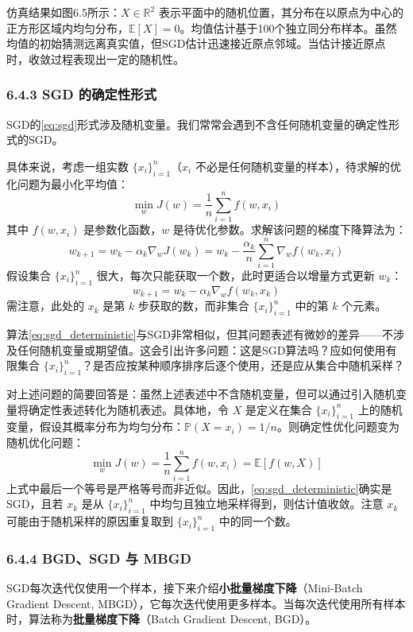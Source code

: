 \documentclass[UTF8]{article}
\begin{document}
仿真结果如图6.5所示：$X \in \mathbb{R}^2$ 表示平面中的随机位置，其分布在以原点为中心的正方形区域内均匀分布，$\mathbb{E}[X] = 0$。均值估计基于100个独立同分布样本。虽然均值的初始猜测远离真实值，但SGD估计迅速接近原点邻域。当估计接近原点时，收敛过程表现出一定的随机性。

\subsubsection*{6.4.3 SGD 的确定性形式}

SGD的\eqref{eq:sgd}形式涉及随机变量。我们常常会遇到不含任何随机变量的确定性形式的SGD。

具体来说，考虑一组实数 $\{x_i\}_{i=1}^{n}$（$x_i$ 不必是任何随机变量的样本），待求解的优化问题为最小化平均值：
\[
\min_w J(w) = \frac{1}{n}\sum_{i=1}^{n} f(w, x_i)
\]
其中 $f(w, x_i)$ 是参数化函数，$w$ 是待优化参数。求解该问题的梯度下降算法为：
\[
w_{k+1} = w_k - \alpha_k \nabla_w J(w_k) = w_k - \frac{\alpha_k}{n}\sum_{i=1}^{n} \nabla_w f(w_k, x_i)
\]
假设集合 $\{x_i\}_{i=1}^{n}$ 很大，每次只能获取一个数，此时更适合以增量方式更新 $w_k$：
\begin{equation}
\label{eq:sgd_deterministic}
w_{k+1} = w_k - \alpha_k \nabla_w f(w_k, x_k)
\end{equation}
需注意，此处的 $x_k$ 是第 $k$ 步获取的数，而非集合 $\{x_i\}_{i=1}^{n}$ 中的第 $k$ 个元素。

算法\eqref{eq:sgd_deterministic}与SGD非常相似，但其问题表述有微妙的差异——不涉及任何随机变量或期望值。这会引出许多问题：这是SGD算法吗？应如何使用有限集合 $\{x_i\}_{i=1}^{n}$？是否应按某种顺序排序后逐个使用，还是应从集合中随机采样？

对上述问题的简要回答是：虽然上述表述中不含随机变量，但可以通过引入随机变量将确定性表述转化为随机表述。具体地，令 $X$ 是定义在集合 $\{x_i\}_{i=1}^{n}$ 上的随机变量，假设其概率分布为均匀分布：$\mathbb{P}(X = x_i) = 1/n$。则确定性优化问题变为随机优化问题：
\[
\min_w J(w) = \frac{1}{n}\sum_{i=1}^{n} f(w, x_i) = \mathbb{E}[f(w, X)]
\]
上式中最后一个等号是严格等号而非近似。因此，\eqref{eq:sgd_deterministic}确实是SGD，且若 $x_k$ 是从 $\{x_i\}_{i=1}^{n}$ 中均匀且独立地采样得到，则估计值收敛。注意 $x_k$ 可能由于随机采样的原因重复取到 $\{x_i\}_{i=1}^{n}$ 中的同一个数。

\subsubsection*{6.4.4 BGD、SGD 与 MBGD}

SGD每次迭代仅使用一个样本，接下来介绍\textbf{小批量梯度下降}（Mini-Batch Gradient Descent, MBGD），它每次迭代使用更多样本。当每次迭代使用所有样本时，算法称为\textbf{批量梯度下降}（Batch Gradient Descent, BGD）。
\end{document}
